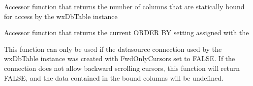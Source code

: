 


\label{wxdbtablegetnewcursor}






\label{wxdbtablegetnext}




\label{wxdbtablegetnumberofcolumns}


Accessor function that returns the number of columns that are statically bound for access by the wxDbTable instance


\label{wxdbtablegetorderbyclause}


Accessor function that returns the current ORDER BY setting assigned with the 


\label{wxdbtablegetprev}



This function can only be used if the datasource connection used by the wxDbTable instance was created with FwdOnlyCursors set to FALSE.  If the connection does not allow backward scrolling cursors, this function will return FALSE, and the data contained in the bound columns will be undefined.




\label{wxdbtablegetquerytablename}




